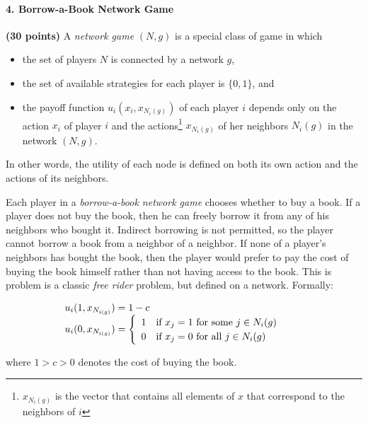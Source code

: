 \documentclass[11pt]{article} %
\begin{document}
\paragraph{4. Borrow-a-Book Network Game} \textbf{(30 points)} A \emph{network game} $(N, g)$ is a special class of game in which 

\begin{itemize}
\item the set of players $N$ is connected by a network $g$,
\item the set of available strategies for each player is $\{0,1\}$, and
\item the payoff function $u_i(x_i, x_{N_i(g)})$ of each player $i$ depends only on the action $x_i$ of player $i$ and the actions\footnote{$x_{N_i(g)}$ is the vector that contains all elements of $x$ that correspond to the neighbors of $i$} $x_{N_i(g)}$ of her neighbors $N_i(g)$ in the network $(N,g)$.\end{itemize}

In other words, the utility of each node is defined on both its own action and the actions of its neighbors.

Each player in a \emph{borrow-a-book network game} chooses whether to buy a book. If a player does not buy the book, then he can freely borrow it  from any of his neighbors who bought it. Indirect borrowing is not permitted, so the player cannot borrow a book from a neighbor of a neighbor. If none of a player's neighbors has bought the book, then the player would prefer to pay the cost of buying the book himself rather than not having access to the book. This is problem is a classic \emph{free rider} problem, but defined on a network. Formally:

 $$\begin{array} {l l }
u_i(1, x_{N_{i(g)}})=1-c &  \\
u_i(0, x_{N_{i(g)}})=\begin{cases}\begin{array} {l l} 1 & \text{if} \ x_j=1 \ \text{for some} \ j\in N_i(g) \\  0 & \text{if} \ x_j=0 \ \text{for all} \ j\in N_i(g)\\ \end{array}\end{cases}
\end{array}$$
 
where $1>c>0$ denotes the cost of buying the book. 
\end{document}
